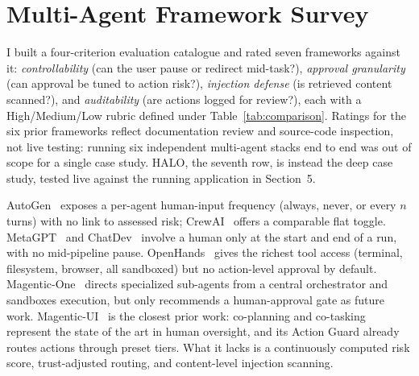 \documentclass[a4paper, 11pt]{article}
\begin{document}
\section{Multi-Agent Framework Survey}

I built a four-criterion evaluation catalogue and rated seven frameworks against
it: \textit{controllability} (can the user pause or redirect mid-task?),
\textit{approval granularity} (can approval be tuned to action risk?),
\textit{injection defense} (is retrieved content scanned?), and
\textit{auditability} (are actions logged for review?), each with a High/Medium/Low
rubric defined under Table~\ref{tab:comparison}. Ratings for the six prior
frameworks reflect documentation review and source-code inspection, not live
testing: running six independent multi-agent stacks end to end was out of
scope for a single case study. HALO, the seventh row, is instead the deep case
study, tested live against the running application in Section~5.

AutoGen~\cite{wu2023autogen} exposes a per-agent human-input frequency (always,
never, or every $n$ turns) with no link to assessed risk; CrewAI~\cite{crewai2024}
offers a comparable flat toggle. MetaGPT~\cite{hong2023metagpt} and
ChatDev~\cite{qian2023chatdev} involve a human only at the start and end of a
run, with no mid-pipeline pause. OpenHands~\cite{wang2024opendevin} gives the
richest tool access (terminal, filesystem, browser, all sandboxed) but no
action-level approval by default. Magentic-One~\cite{fourney2024magentic}
directs specialized sub-agents from a central orchestrator and sandboxes
execution, but only recommends a human-approval gate as future work.
Magentic-UI~\cite{fourney2025magenticui} is the closest prior work: co-planning
and co-tasking represent the state of the art in human oversight, and its Action
Guard already routes actions through preset tiers. What it lacks is a
continuously computed risk score, trust-adjusted routing, and content-level
injection scanning.
\end{document}
